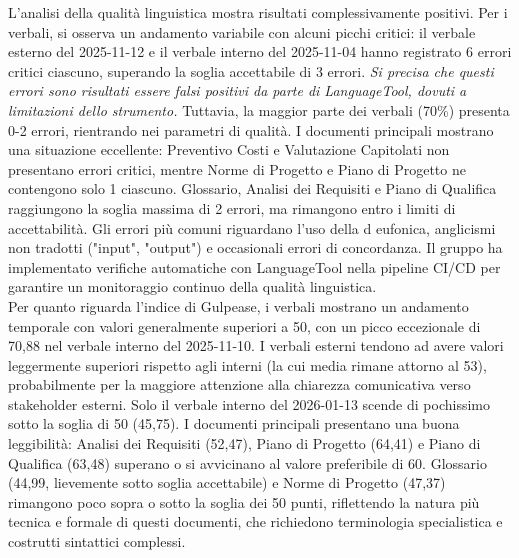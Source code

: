 \documentclass[a4paper,11pt,oneside]{scrartcl}
\begin{document}
L'analisi della qualità linguistica mostra risultati complessivamente positivi. Per i verbali, si osserva un andamento variabile con alcuni picchi critici: il verbale esterno del 2025-11-12 e il verbale interno del 2025-11-04 hanno registrato 6 errori critici ciascuno, superando la soglia accettabile di 3 errori. \textit{Si precisa che questi errori sono risultati essere falsi positivi da parte di LanguageTool, dovuti a limitazioni dello strumento.} Tuttavia, la maggior parte dei verbali (70\%) presenta 0-2 errori, rientrando nei parametri di qualità. I documenti principali mostrano una situazione eccellente: Preventivo Costi e Valutazione Capitolati non presentano errori critici, mentre Norme di Progetto e Piano di Progetto ne contengono solo 1 ciascuno. Glossario, Analisi dei Requisiti e Piano di Qualifica raggiungono la soglia massima di 2 errori, ma rimangono entro i limiti di accettabilità. Gli errori più comuni riguardano l'uso della d eufonica, anglicismi non tradotti ("input", "output") e occasionali errori di concordanza. Il gruppo ha implementato verifiche automatiche con LanguageTool nella pipeline CI/CD per garantire un monitoraggio continuo della qualità linguistica.\\
Per quanto riguarda l'indice di Gulpease, i verbali mostrano un andamento temporale con valori generalmente superiori a 50, con un picco eccezionale di 70,88 nel verbale interno del 2025-11-10. I verbali esterni tendono ad avere valori leggermente superiori rispetto agli interni (la cui media rimane attorno al 53), probabilmente per la maggiore attenzione alla chiarezza comunicativa verso stakeholder esterni. Solo il verbale interno del 2026-01-13 scende di pochissimo sotto la soglia di 50 (45,75). I documenti principali presentano una buona leggibilità: Analisi dei Requisiti (52,47), Piano di Progetto (64,41) e Piano di Qualifica (63,48) superano o si avvicinano al valore preferibile di 60. Glossario (44,99, lievemente sotto soglia accettabile) e Norme di Progetto (47,37) rimangono poco sopra o sotto la soglia dei 50 punti, riflettendo la natura più tecnica e formale di questi documenti, che richiedono terminologia specialistica e costrutti sintattici complessi.
\end{document}
